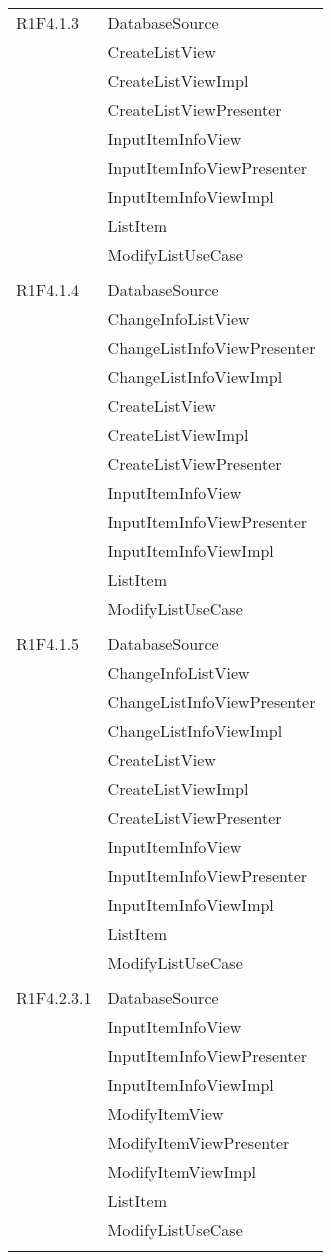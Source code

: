 \begin{center}
\begin{longtable}{|p{7cm}|p{7cm}|}
		R1F4.1.3 & DatabaseSource \\ & CreateListView \\ & CreateListViewImpl \\ & CreateListViewPresenter \\ & InputItemInfoView \\ & InputItemInfoViewPresenter \\ & InputItemInfoViewImpl \\ & ListItem \\ & ModifyListUseCase \\ & \\ \hline
		R1F4.1.4 & DatabaseSource \\ & ChangeInfoListView \\ & ChangeListInfoViewPresenter \\ & ChangeListInfoViewImpl \\ & CreateListView \\ & CreateListViewImpl \\ & CreateListViewPresenter \\ & InputItemInfoView \\ & InputItemInfoViewPresenter \\ & InputItemInfoViewImpl \\ & ListItem \\ & ModifyListUseCase \\ & \\ \hline
		R1F4.1.5 & DatabaseSource \\ & ChangeInfoListView \\ & ChangeListInfoViewPresenter \\ & ChangeListInfoViewImpl \\ & CreateListView \\ & CreateListViewImpl \\ & CreateListViewPresenter \\ & InputItemInfoView \\ & InputItemInfoViewPresenter \\ & InputItemInfoViewImpl \\ & ListItem \\ & ModifyListUseCase \\ & \\ \hline
		R1F4.2.3.1 & DatabaseSource \\ & InputItemInfoView \\ & InputItemInfoViewPresenter \\ & InputItemInfoViewImpl \\ & ModifyItemView \\ & ModifyItemViewPresenter \\ & ModifyItemViewImpl \\ & ListItem \\ & ModifyListUseCase \\ & \\ \hline

\end{longtable}
\end{center}
